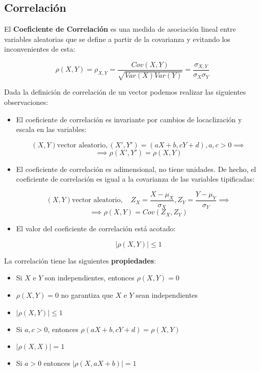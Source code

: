 \newpage

\subsection{Correlación}

El \textbf{Coeficiente de Correlación} es una medida de asociación lineal entre variables aleatorias que se define a partir de la covarianza
y evitando los inconvenientes de esta: 

\[ \rho(X, Y) = \rho_{X, Y} = \frac{Cov(X, Y)}{\sqrt{Var(X)Var(Y)}} = \frac{\sigma_{X, Y}}{\sigma_X\sigma_Y} \]

Dada la definición de correlación de un vector podemos realizar las siguientes observaciones: 

\begin{itemize}
    \item El coeficiente de correlación es invariante por cambios de locaclización y escala en las variables:
    
    \[ (X, Y) \text{vector aleatorio}, (X', Y') = (aX + b, cY + d), a, c > 0 \implies \]
    \[ \implies \rho(X', Y') = \rho(X, Y) \]

    \item El coeficiente de correlación es adimensional, no tiene unidades. De hecho, el coeficiente de correlación es igual a la covarianza
            de las variables tipificadas:

    \[ (X, Y) \text{vector aleatorio}, \quad Z_{X} = \frac{X - \mu_{X}}{\sigma_X}, Z_{Y} = \frac{Y - \mu_Y}{\sigma_Y} \implies \]
    \[ \implies \rho(X, Y) = Cov(Z_X, Z_Y) \]

    \item El valor del coeficiente de correlación está acotado:
    
    \[ |\rho(X, Y)| \leq 1 \]


\end{itemize}

La correlación tiene las siguientes \textbf{propiedades}:
\begin{itemize}
    \item Si $X$ e $Y$ son independientes, entonces $\rho(X, Y) = 0$
    \item $\rho(X, Y) = 0$ no garantiza que $X$ e $Y$ sean independientes
    \item $|\rho(X, Y)| \leq 1$
    \item Si $a, c > 0$, entonces $\rho(aX + b, cY + d) = \rho(X, Y)$
    \item $|\rho(X, X)| = 1$
    \item Si $a > 0$ entonces $|\rho(X, aX + b)| = 1$
\end{itemize}

